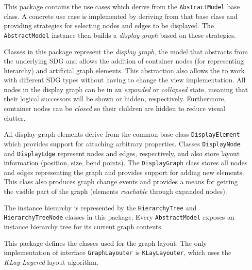 \begin{description}
   This package contains the use cases which derive from the \lstinline|AbstractModel| base class. A 
  concrete use case is implemented by deriving from that base class and providing strategies for selecting nodes and 
  edges to be displayed. The \lstinline|AbstractModel| instance then builds a \emph{display graph} based on these 
  strategies.
  
   Classes in this package represent the \emph{display graph}, the model that abstracts from the 
  underlying SDG and allows the addition of container nodes (for representing hierarchy) and artificial graph elements. 
  This abstraction also allows the \SB to work with different SDG types without having to change the view 
  implementation. All nodes in the display graph can be in an \emph{expanded} or \emph{collapsed} state, meaning that 
  their logical successors will be shown or hidden, respectively. Furthermore, container nodes can be \emph{closed} so 
  their children are hidden to reduce visual clutter.
  
  All display graph elements derive from the common base class \lstinline|DisplayElement| which provides support for 
  attaching arbitrary properties. Classes \lstinline|DisplayNode| and \lstinline|DisplayEdge| represent nodes and 
  edges, respectively, and also store layout information (position, size, bend points). The \lstinline|DisplayGraph| 
  class stores all nodes and edges representing the graph and provides support for adding new elements. This class also 
  produces graph change events and provides a means for getting the visible part of the graph (elements 
  \emph{reachable} through expanded nodes).
  
   The instance hierarchy is represented by the \lstinline|HierarchyTree| and 
  \lstinline|HierarchyTreeNode| classes in this package. Every \lstinline|AbstractModel| exposes an instance hierarchy 
  tree for its current graph contents.
  
   This package defines the classes used for the graph layout. The only implementation of 
  interface \lstinline|GraphLayouter| is \lstinline|KLayLayouter|, which uses the \emph{KLay Layered}\footnotemark{} 
  layout algorithm.
  
  

\end{description}
